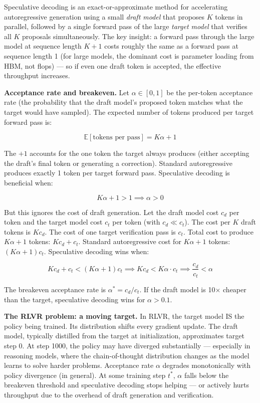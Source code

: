 Speculative decoding is an exact-or-approximate method for accelerating autoregressive generation using a small \textit{draft model} that proposes $K$ tokens in parallel, followed by a single forward pass of the large \textit{target model} that verifies all $K$ proposals simultaneously. The key insight: a forward pass through the large model at sequence length $K+1$ costs roughly the same as a forward pass at sequence length 1 (for large models, the dominant cost is parameter loading from HBM, not flops) --- so if even one draft token is accepted, the effective throughput increases.

\textbf{Acceptance rate and breakeven.} Let $\alpha \in [0,1]$ be the per-token acceptance rate (the probability that the draft model's proposed token matches what the target would have sampled). The expected number of tokens produced per target forward pass is:

$$\mathbb{E}[\text{tokens per pass}] = K\alpha + 1$$

The $+1$ accounts for the one token the target always produces (either accepting the draft's final token or generating a correction). Standard autoregressive produces exactly 1 token per target forward pass. Speculative decoding is beneficial when:

$$K\alpha + 1 > 1 \implies \alpha > 0$$

But this ignores the cost of draft generation. Let the draft model cost $c_d$ per token and the target model cost $c_t$ per token (with $c_d \ll c_t$). The cost per $K$ draft tokens is $K c_d$. The cost of one target verification pass is $c_t$. Total cost to produce $K\alpha + 1$ tokens: $K c_d + c_t$. Standard autoregressive cost for $K\alpha + 1$ tokens: $(K\alpha + 1) c_t$. Speculative decoding wins when:

$$K c_d + c_t < (K\alpha + 1) c_t \implies K c_d < K\alpha \cdot c_t \implies \frac{c_d}{c_t} < \alpha$$

The breakeven acceptance rate is $\alpha^* = c_d / c_t$. If the draft model is 10$\times$ cheaper than the target, speculative decoding wins for $\alpha > 0.1$.

\textbf{The RLVR problem: a moving target.} In RLVR, the target model IS the policy being trained. Its distribution shifts every gradient update. The draft model, typically distilled from the target at initialization, approximates target step 0. At step 1000, the policy may have diverged substantially --- especially in reasoning models, where the chain-of-thought distribution changes as the model learns to solve harder problems. Acceptance rate $\alpha$ degrades monotonically with policy divergence (in general). At some training step $t^*$, $\alpha$ falls below the breakeven threshold and speculative decoding stops helping --- or actively hurts throughput due to the overhead of draft generation and verification.

